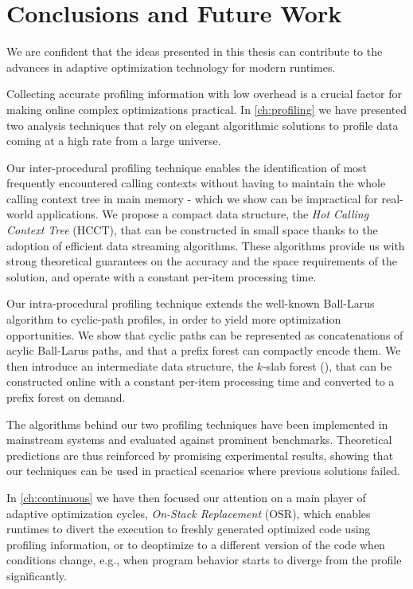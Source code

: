 
\chapter{Conclusions and Future Work}
\label{ch:conclusions}

We are confident that the ideas presented in this thesis can contribute to the advances in adaptive optimization technology for modern runtimes.

Collecting accurate profiling information with low overhead is a crucial factor for making online complex optimizations practical. In \mychapter\ref{ch:profiling} we have presented two analysis techniques that rely on elegant algorithmic solutions to profile data coming at a high rate from a large universe.

Our inter-procedural profiling technique enables the identification of most frequently encountered calling contexts without having to maintain the whole calling context tree in main memory - which we show can be impractical for real-world applications. We propose a compact data structure, the {\em Hot Calling Context Tree} (HCCT), that can be constructed in small space thanks to the adoption of efficient data streaming algorithms. These algorithms provide us with strong theoretical guarantees on the accuracy and the space requirements of the solution, and operate with a constant per-item processing time.

Our intra-procedural profiling technique extends the well-known Ball-Larus algorithm to cyclic-path profiles, in order to yield more optimization opportunities. We show that cyclic paths can be represented as concatenations of acylic Ball-Larus paths, and that a prefix forest can compactly encode them. We then introduce an intermediate data structure, the $k$-slab forest (\ksf), that can be constructed online with a constant per-item processing time and converted to a prefix forest on demand.

The algorithms behind our two profiling techniques have been implemented in mainstream systems and evaluated against prominent benchmarks. Theoretical predictions are thus reinforced by promising experimental results, showing that our techniques can be used in practical scenarios where previous solutions failed.

In \mychapter\ref{ch:continuous} we have then focused our attention on a main player of adaptive optimization cycles, {\em On-Stack Replacement} (OSR), which enables runtimes to divert the execution to freshly generated optimized code using profiling information, or to deoptimize to a different version of the code when conditions change, e.g., when program behavior starts to diverge from the profile significantly.

